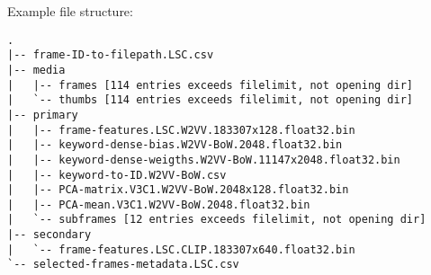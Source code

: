 \begin{minipage}{\linewidth}

Example file structure:

\begin{lstlisting}
.
|-- frame-ID-to-filepath.LSC.csv
|-- media
|   |-- frames [114 entries exceeds filelimit, not opening dir]
|   `-- thumbs [114 entries exceeds filelimit, not opening dir]
|-- primary
|   |-- frame-features.LSC.W2VV.183307x128.float32.bin
|   |-- keyword-dense-bias.W2VV-BoW.2048.float32.bin
|   |-- keyword-dense-weigths.W2VV-BoW.11147x2048.float32.bin
|   |-- keyword-to-ID.W2VV-BoW.csv
|   |-- PCA-matrix.V3C1.W2VV-BoW.2048x128.float32.bin
|   |-- PCA-mean.V3C1.W2VV-BoW.2048.float32.bin
|   `-- subframes [12 entries exceeds filelimit, not opening dir]
|-- secondary
|   `-- frame-features.LSC.CLIP.183307x640.float32.bin
`-- selected-frames-metadata.LSC.csv

\end{lstlisting}
\end{minipage}
